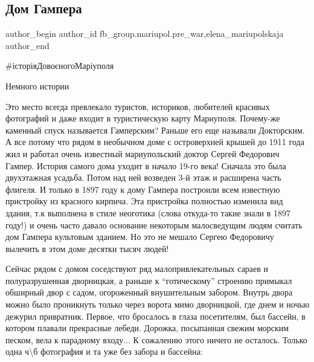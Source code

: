  
 
 
 
 

\subsection{Дом Гампера}
\label{sec:22_12_2022.fb.fb_group.mariupol.pre_war.1.dom_gampera}
 
\ifcmt
 author_begin
   author_id fb_group.mariupol.pre_war,elena_mariupolskaja
 author_end
\fi

\#історіяДовоєногоМаріуполя

Немного истории

Это место всегда превлекало туристов, историков, любителей красивых фотографий
и даже входит в туристическую карту Мариуполя. Почему-же каменный спуск
называется Гамперским? Раньше его еще называли Докторским. А все потому что
рядом в необычном доме с островерхней крышей до 1911 года жил и работал очень
известный мариупольский доктор Сергей Федорович Гампер. История самого дома
уходит в начало 19-го века! Сначала это была двухэтажная усадьба. Потом над ней
возведен 3-й этаж и расширена часть флигеля. И только в 1897 году к дому
Гампера построили всем известную пристройку из красного кирпича. Эта пристройка
полностью изменила вид здания, т.к выполнена в стиле неоготика (слова откуда-то
такие знали в 1897 году!) и очень часто давало основание некоторым малосведущим
людям считать дом Гампера культовым зда­нием. Но это не мешало Сергею
Федоровичу вылечить в этом доме десятки тысяч людей!

Сейчас рядом с домом соседствуют ряд малопривлекательных сараев и
полуразрушенная дворницкая, а раньше к \enquote{готическому} строению примыкал
обширный двор с садом, огороженный внушительным забором. Внутрь двора мож­но
было проникнуть только через ворота мимо дворницкой, где днем и ночью дежурил
привратник. Первое, что бросалось в глаза посетителям, был бассейн, в котором
плава­ли прекрасные лебеди. Дорожка, посыпанная свежим морским песком, вела к
парадному входу... К сожалению этого ничего не осталось. Только одна ч\textbackslash б
фотография и та уже без забора и бассейна:


